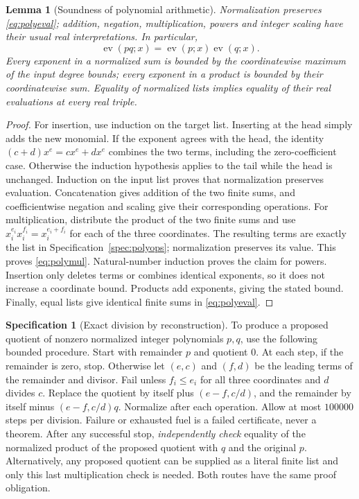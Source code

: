 \documentclass[11pt,a4paper]{article}
\newtheorem{lemma}{Lemma}[section]
\theoremstyle{definition}
\newtheorem{specification}{Specification}[section]
\newcommand{\E}[2]{\refstepcounter{equation}\[#2\tag{\theequation}\label{eq:#1}\]}
\DeclareMathOperator{\ev}{ev}
\begin{document}
\begin{lemma}[Soundness of polynomial arithmetic]\label{lem:polyops}
Normalization preserves \eqref{eq:polyeval}; addition, negation, multiplication, powers and integer scaling have their usual real interpretations. In particular,
\E{polymul}{\ev(pq;x)=\ev(p;x)\ev(q;x).}
Every exponent in a normalized sum is bounded by the coordinatewise maximum of the input degree bounds; every exponent in a product is bounded by their coordinatewise sum. Equality of normalized lists implies equality of their real evaluations at every real triple.
\end{lemma}
\begin{proof}
For insertion, use induction on the target list. Inserting at the head simply adds the new monomial. If the exponent agrees with the head, the identity $(c+d)x^e=cx^e+dx^e$ combines the two terms, including the zero-coefficient case. Otherwise the induction hypothesis applies to the tail while the head is unchanged. Induction on the input list proves that normalization preserves evaluation.
Concatenation gives addition of the two finite sums, and coefficientwise negation and scaling give their corresponding operations. For multiplication, distribute the product of the two finite sums and use $x_i^{e_i}x_i^{f_i}=x_i^{e_i+f_i}$ for each of the three coordinates. The resulting terms are exactly the list in Specification~\ref{spec:polyops}; normalization preserves its value. This proves \eqref{eq:polymul}. Natural-number induction proves the claim for powers.
Insertion only deletes terms or combines identical exponents, so it does not increase a coordinate bound. Products add exponents, giving the stated bound. Finally, equal lists give identical finite sums in \eqref{eq:polyeval}.
\end{proof}

\begin{specification}[Exact division by reconstruction]\label{spec:divide}
To produce a proposed quotient of nonzero normalized integer polynomials $p,q$, use the following bounded procedure. Start with remainder $p$ and quotient $0$. At each step, if the remainder is zero, stop. Otherwise let $(e,c)$ and $(f,d)$ be the leading terms of the remainder and divisor. Fail unless $f_i\leq e_i$ for all three coordinates and $d$ divides $c$. Replace the quotient by itself plus $(e-f,c/d)$, and the remainder by itself minus $(e-f,c/d)q$. Normalize after each operation. Allow at most $100000$ steps per division. Failure or exhausted fuel is a failed certificate, never a theorem.
After any successful stop, \emph{independently check} equality of the normalized product of the proposed quotient with $q$ and the original $p$.
Alternatively, any proposed quotient can be supplied as a literal finite list and only this last multiplication check is needed. Both routes have the same proof obligation.
\end{specification}
\end{document}
